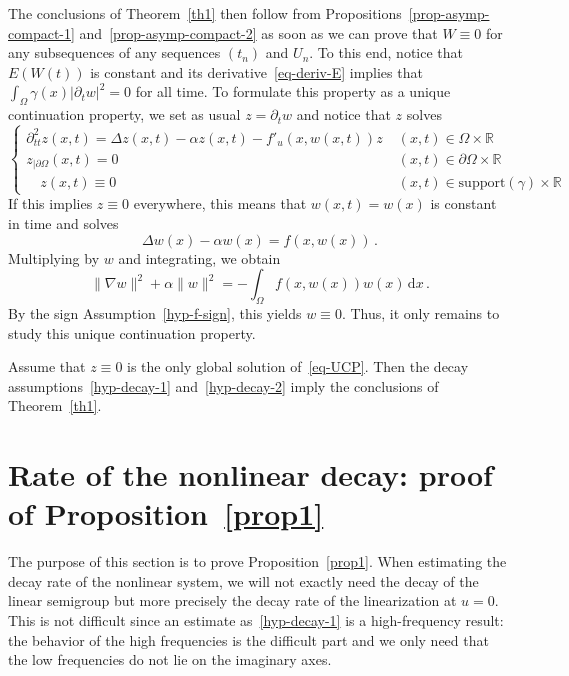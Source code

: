 \documentclass[AHL,Unicode,longabstracts]{cedram}
\newcommand{\RR}{\mathbb{R}}
\newcommand{\drm}{\mathrm{d}}
\newcommand{\grad}{\nabla}
\begin{document}
The conclusions of Theorem~\ref{th1} then follow from Propositions~\ref{prop-asymp-compact-1} and~\ref{prop-asymp-compact-2} as soon as we can prove that $W\equiv 0$ for any subsequences of any sequences $(t_n)$ and $U_n$. To this end, notice that $E(W(t))$ is constant and its derivative~\eqref{eq-deriv-E} implies that $\int_\Omega \gamma(x) |\partial_t w|^2=0$ for all time. To formulate this property as a unique continuation property, we set as usual $z=\partial_t w$ and notice that $z$ solves
\begin{equation}\label{eq-UCP}
\begin{cases}
\partial_{tt}^2 z(x,t) = \Delta z(x,t) - \alpha z(x,t) - f'_u(x,w(x,t)) z\;&(x,t)\in\Omega\times\RR\\
z_{|\partial\Omega}(x,t)=0&(x,t)\in\partial\Omega\times \RR\\
\quad z(x,t)\equiv 0 & (x,t)\in \text{support}(\gamma)\times \RR
\end{cases}
\end{equation}
If this implies $z\equiv 0$ everywhere, this means that $w(x,t)=w(x)$ is constant in time and solves
\[
\Delta w(x)-\alpha w(x)=f(x,w(x))\,.
\]
Multiplying by $w$ and integrating, we obtain
\[
\|\grad w\|^2 +\alpha \|w\|^2 = -\int_\Omega f(x,w(x))w(x)\,\drm x\,.
\]
By the sign Assumption~\eqref{hyp-f-sign}, this yields $w\equiv 0$. Thus, it only remains to study this unique continuation property.

\begin{prop}\label{prop-UCP-implique-th}
Assume that $z\equiv 0$ is the only global solution of~\eqref{eq-UCP}. Then the decay assumptions~\eqref{hyp-decay-1} and~\eqref{hyp-decay-2} imply the conclusions of Theorem~\ref{th1}.
\end{prop}


\section{Rate of the nonlinear decay: proof of Proposition~\ref{prop1}}\label{section-decay}
The purpose of this section is to prove Proposition~\ref{prop1}. When estimating the decay rate of the nonlinear system, we will not exactly need the decay of the linear semigroup but more precisely the decay rate of the linearization at $u=0$. This is not difficult since an estimate as~\eqref{hyp-decay-1} is a high-frequency result: the behavior of the high frequencies is the difficult part and we only need that the low frequencies do not lie on the imaginary axes.
\end{document}
